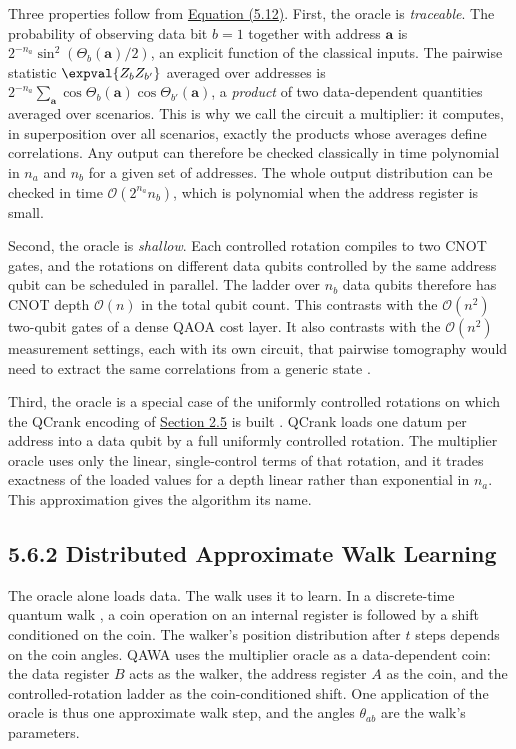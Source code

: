 \documentclass{report}
\theoremstyle{plain}
\theoremstyle{definition}
\theoremstyle{remark}
\newcommand{\bigO}[1]{\mathcal{O}\!\left(#1\right)}
\begin{document}
Three properties follow from \hyperref[eq:nisq:oracle-state]{Equation (5.12)}. First, the oracle is \emph{traceable}. The probability of observing data bit $b=1$ together with address $\bm{a}$ is $2^{-n_{a}}\sin^{2}(\Theta_{b}(\bm{a})/2)$, an explicit function of the classical inputs. The pairwise statistic $\expval{Z_{b}Z_{b'}}$ averaged over addresses is $2^{-n_{a}}\sum_{\bm{a}}\cos\Theta_{b}(\bm{a})\cos\Theta_{b'}(\bm{a})$, a \emph{product} of two data-dependent quantities averaged over scenarios. This is why we call the circuit a multiplier: it computes, in superposition over all scenarios, exactly the products whose averages define correlations. Any output can therefore be checked classically in time polynomial in $n_{a}$ and $n_{b}$ for a given set of addresses. The whole output distribution can be checked in time $\bigO{2^{n_{a}}n_{b}}$, which is polynomial when the address register is small.

Second, the oracle is \emph{shallow}. Each controlled rotation compiles to two CNOT gates, and the rotations on different data qubits controlled by the same address qubit can be scheduled in parallel. The ladder over $n_{b}$ data qubits therefore has CNOT depth $\bigO{n}$ in the total qubit count. This contrasts with the $\bigO{n^{2}}$ two-qubit gates of a dense QAOA cost layer. It also contrasts with the $\bigO{n^{2}}$ measurement settings, each with its own circuit, that pairwise tomography would need to extract the same correlations from a generic state \cite{huang2020shadows}.

Third, the oracle is a special case of the uniformly controlled rotations \cite{mottonen2004ucr} on which the QCrank encoding of \hyperref[sec:bg:encoding]{Section 2.5} is built \cite{balewski2024qcrank}. QCrank loads one datum per address into a data qubit by a full uniformly controlled rotation. The multiplier oracle uses only the linear, single-control terms of that rotation, and it trades exactness of the loaded values for a depth linear rather than exponential in $n_{a}$. This approximation gives the algorithm its name.

\subsection{5.6.2 Distributed Approximate Walk Learning}\label{sec:nisq:walk}

The oracle alone loads data. The walk uses it to learn. In a discrete-time quantum walk \cite{childs2009quantumwalk}, a coin operation on an internal register is followed by a shift conditioned on the coin. The walker's position distribution after $t$ steps depends on the coin angles. QAWA uses the multiplier oracle as a data-dependent coin: the data register $B$ acts as the walker, the address register $A$ as the coin, and the controlled-rotation ladder as the coin-conditioned shift. One application of the oracle is thus one approximate walk step, and the angles $\theta_{ab}$ are the walk's parameters.
\end{document}
